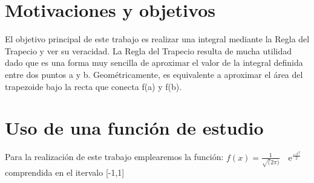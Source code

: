 

\section{Motivaciones y objetivos}
\label{1:sec:1}
\parindent=0.5cm
\raggedright
El objetivo principal de este trabajo es realizar una integral mediante la Regla del Trapecio y ver
su veracidad. La Regla del Trapecio resulta de mucha utilidad dado que es una forma muy sencilla de
aproximar el valor de la integral definida entre dos puntos a y b. Geométricamente, es equivalente a
aproximar el área del  trapezoide bajo la recta que conecta f(a) y f(b).

\section{Uso de una función de estudio}
\label{1:sec:2}
\parindent=0.5cm
\raggedright
Para la realización de este trabajo emplearemos la función:
$f(x)=\frac{1}{\sqrt(2\pi)} \quad\text{e}^{\frac{-x^2}{2}}$
comprendida en el itervalo [-1,1]
